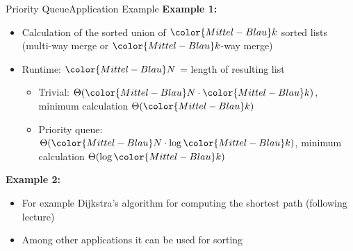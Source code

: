 \begin{frame}{Priority Queue}{Application Example}
  \textbf{Example 1:}
  \begin{itemize}
    \item<2->
      Calculation of the sorted union of ${\color{Mittel-Blau}k}$ sorted lists\\
      (multi-way merge or ${\color{Mittel-Blau}k}$-way merge)
    \item<3->
      Runtime:
      ${\color{Mittel-Blau}N}$ = length of resulting list
      \begin{itemize}
        \item<4->
          Trivial:
          \begin{math}
            \Theta({\color{Mittel-Blau}N} \cdot {\color{Mittel-Blau}k})
          \end{math},
          minimum calculation $\Theta({\color{Mittel-Blau}k})$
        \item<5->
          Priority queue:
          \begin{math}
            \Theta({\color{Mittel-Blau}N} \cdot \log {\color{Mittel-Blau}k})
          \end{math},
          minimum calculation  $\Theta(\log {\color{Mittel-Blau}k})$
      \end{itemize}
  \end{itemize}
  \textbf{Example 2:}
  \begin{itemize}
    \item<7->
      For example Dijkstra's algorithm for computing the shortest path (following lecture)
    \item<8->
      Among other applications it can be used for sorting
  \end{itemize}
\end{frame}



